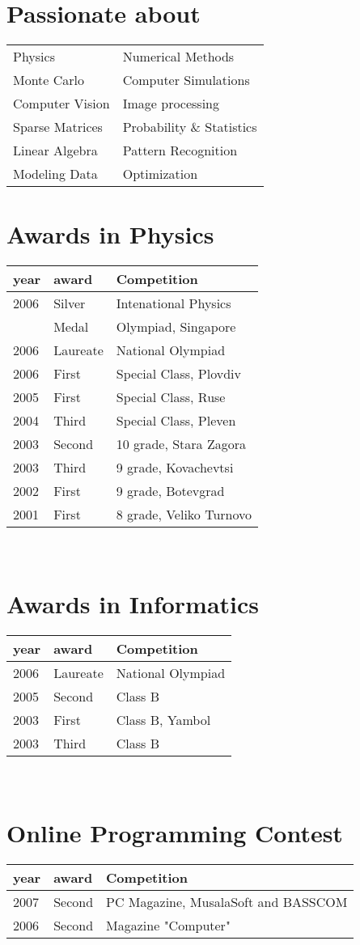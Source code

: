 \section*{Passionate about}
\begin{tabular}{ l l }
Physics             & Numerical Methods         \\
Monte Carlo         & Computer Simulations      \\
Computer Vision     & Image processing          \\
Sparse Matrices     & Probability \& Statistics \\ 
Linear Algebra      & Pattern Recognition       \\    
Modeling Data       & Optimization              \\
\end{tabular}

\section*{Awards in Physics}
\begin{tabular}{ p{} p{} p{} }
year & award & Competition \\
\hline
2006 & Silver  & Intenational Physics \\
     & Medal   & Olympiad, Singapore  \\
2006 & Laureate& National Olympiad\\
2006 & First   & Special Class, Plovdiv  \\
2005 & First   & Special Class, Ruse     \\
2004 & Third   & Special Class, Pleven   \\
2003 & Second  & 10 grade, Stara Zagora  \\
2003 & Third   & 9 grade,  Kovachevtsi   \\
2002 & First   & 9 grade,  Botevgrad     \\
2001 & First   & 8 grade,  Veliko Turnovo\\
\end{tabular}\\
\section*{Awards in Informatics}
\begin{tabular}{ p{} p{} p{} }
year & award & Competition \\
\hline
2006 & Laureate  & National Olympiad \\
2005 & Second    & Class B \\
2003 & First     & Class B, Yambol \\
2003 & Third     & Class B \\
\end{tabular}\\
\section*{Online Programming Contest}
\begin{tabular}{ p{} p{} p{} }
year & award & Competition \\
\hline
2007 & Second    & PC Magazine, MusalaSoft and BASSCOM \\
2006 & Second    & Magazine "Computer"\\
\end{tabular}\\
